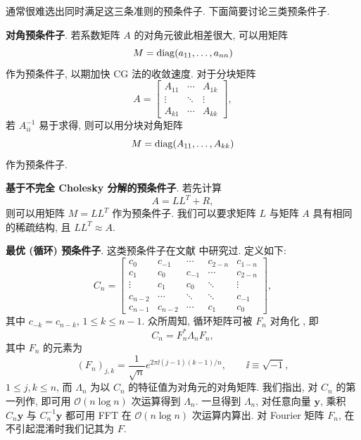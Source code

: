 通常很难选出同时满足这三条准则的预条件子. 下面简要讨论三类预条件子.
\begin{parenlist}
  \item \textbf{对角预条件子}. 若系数矩阵 $A$ 的对角元彼此相差很大, 可以用矩阵
    \[
      M=\operatorname{diag}(a_{11},\ldots,a_{nn})
    \]
    作为预条件子, 以期加快 CG 法的收敛速度. 对于分块矩阵
    \[
      A=\begin{bmatrix}
        A_{11} & \cdots & A_{1k}\\
        \vdots & \ddots & \vdots\\
        A_{k1} & \cdots & A_{kk}
      \end{bmatrix},
    \]
    若 $A_{ii}^{-1}$ 易于求得, 则可以用分块对角矩阵
    \[
      M=\operatorname{diag}(A_{11},\ldots,A_{kk})
    \]
    作为预条件子.

  \item \textbf{基于不完全 Cholesky 分解的预条件子}. 若先计算 \cite{src:32}
    \[
      A=LL^T+R,
    \]
    则可以用矩阵 $M=LL^T$ 作为预条件子. 我们可以要求矩阵 $L$ 与矩阵 $A$ 具有相同的稀疏结构, 且 $LL^T\approx A$.

  \item \textbf{最优 (循环) 预条件子}. 这类预条件子在文献 \cite{src:16,src:18,src:21,src:42,src:43,src:77} 中研究过. 定义如下:
    \[
      C_n=\begin{bmatrix}
        c_0 & c_{-1} & \cdots & c_{2-n} & c_{1-n}\\
        c_1 & c_0 & c_{-1} & \cdots & c_{2-n}\\
        \vdots & c_1 & c_0 & \ddots & \vdots\\
        c_{n-2} & \cdots & \ddots & \ddots & c_{-1}\\
        c_{n-1} & c_{n-2} & \cdots & c_1 & c_0
      \end{bmatrix},
    \]
    其中 $c_{-k}=c_{n-k}$, $1\leqslant k\leqslant n-1$. 众所周知, 循环矩阵可被  $F_n$ 对角化 \cite{src:29}, 即
    \begin{equation}
      C_n=F_n^*\Lambda_nF_n,
      \label{eq:6-19}
    \end{equation}
    其中 $F_n$ 的元素为
    \[
      (F_n)_{j,k}=\frac{1}{\sqrt{n}}e^{2\pi\ii(j-1)(k-1)/n},
      \qquad \ii\equiv\sqrt{-1},
    \]
    $1\leqslant j,k\leqslant n$, 而 $\Lambda_n$ 为以 $C_n$ 的特征值为对角元的对角矩阵. 我们指出, 对 $C_n$ 的第一列作, 即可用 $\mathcal{O}(n\log n)$ 次运算得到 $\Lambda_n$. 一旦得到 $\Lambda_n$, 对任意向量 $\mathbf{y}$, 乘积 $C_n\mathbf{y}$ 与 $C_n^{-1}\mathbf{y}$ 都可用 FFT 在 $\mathcal{O}(n\log n)$ 次运算内算出. 对 Fourier 矩阵 $F_n$, 在不引起混淆时我们记其为 $F$.
\end{parenlist}

